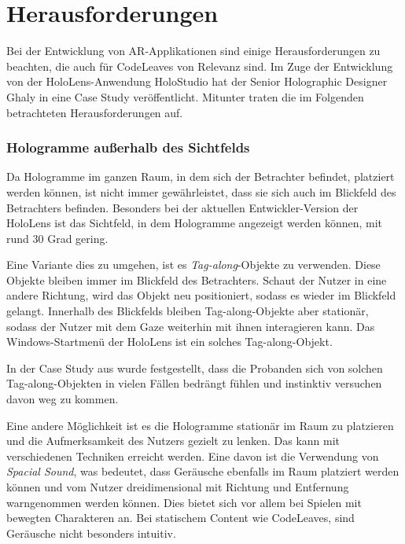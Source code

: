 \section{Herausforderungen}

Bei der Entwicklung von AR-Applikationen sind einige Herausforderungen zu beachten, die auch für CodeLeaves von Relevanz sind. Im Zuge der Entwicklung von der HoloLens-Anwendung HoloStudio hat der Senior Holographic Designer Ghaly in \cite{windows2017casestudy3} eine Case Study veröffentlicht. Mitunter traten die im Folgenden betrachteten Herausforderungen auf.

\subsubsection*{Hologramme außerhalb des Sichtfelds}

Da Hologramme im ganzen Raum, in dem sich der Betrachter befindet, platziert werden können, ist nicht immer gewährleistet, dass sie sich auch im Blickfeld des Betrachters befinden. Besonders bei der aktuellen Entwickler-Version der HoloLens ist das Sichtfeld, in dem Hologramme angezeigt werden können, mit rund 30 Grad \cite{czerulla2017microsoft} gering.

Eine Variante dies zu umgehen, ist es \textit{Tag-along}-Objekte zu verwenden. Diese Objekte bleiben immer im Blickfeld des Betrachters. Schaut der Nutzer in eine andere Richtung, wird das Objekt neu positioniert, sodass es wieder im Blickfeld gelangt. Innerhalb des Blickfelds bleiben Tag-along-Objekte aber stationär, sodass der Nutzer mit dem Gaze weiterhin mit ihnen interagieren kann. Das Windows-Startmenü der HoloLens ist ein solches Tag-along-Objekt.

In der Case Study aus \cite{windows2017casestudy3} wurde festgestellt, dass die Probanden sich von solchen Tag-along-Objekten in vielen Fällen bedrängt fühlen und instinktiv versuchen davon weg zu kommen.

Eine andere Möglichkeit ist es die Hologramme stationär im Raum zu platzieren und die Aufmerksamkeit des Nutzers gezielt zu lenken. Das kann mit verschiedenen Techniken erreicht werden. Eine davon ist die Verwendung von \textit{Spacial Sound}, was bedeutet, dass Geräusche ebenfalls im Raum platziert werden können und vom Nutzer dreidimensional mit Richtung und Entfernung warngenommen werden können. Dies bietet sich vor allem bei Spielen mit bewegten Charakteren an. Bei statischem Content wie CodeLeaves, sind Geräusche nicht besonders intuitiv.

